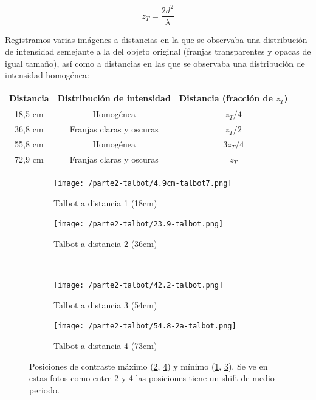 \documentclass{./packages/optica-article}
\begin{document}
\begin{center}
    \begin{equation}
        z_T = \frac{2d^2}{\lambda}
        \label{ec:zt}
    \end{equation}
\end{center}


Registramos varias imágenes a distancias en la que se observaba una distribución de intensidad semejante a la del objeto original (franjas transparentes y opacas de igual tamaño), así como a distancias en las que se observaba una distribución de intensidad homogénea:\par

\begin{center}
    \begin{tabular}{|c|c|c|} \hline
        Distancia & Distribución de intensidad & Distancia (fracción de $z_T$)\\ \hline
        18,5 cm & Homogénea & $z_T/4$\\ \hline
        36,8 cm & Franjas claras y oscuras & $z_T/2$\\ \hline
        55,8 cm & Homogénea & $3z_T/4$\\ \hline
        72,9 cm & Franjas claras y oscuras & $z_T$\\ \hline
    \end{tabular}
\end{center}

\begin{figure}[hptb]
\begin{center}
    \begin{subfigure}[t]{0.45\textwidth}\centering
        \texttt{[image: /parte2-talbot/4.9cm-talbot7.png]}
        \caption{ Talbot a distancia 1 (18cm)}
        \label{fig:talbot1}	
    \end{subfigure}
	\quad
	\begin{subfigure}[t]{0.45\textwidth}\centering
		\texttt{[image: /parte2-talbot/23.9-talbot.png]}
        \caption{Talbot a distancia 2 (36cm)}
        \label{fig:talbot2}
	\end{subfigure}
	\\
	\begin{subfigure}[t]{0.45\textwidth}\centering
		\texttt{[image: /parte2-talbot/42.2-talbot.png]}
        \caption{ Talbot a distancia 3 (54cm)}
        \label{fig:talbot3}
	\end{subfigure}
	\quad
	\begin{subfigure}[t]{0.45\textwidth}\centering
		\texttt{[image: /parte2-talbot/54.8-2a-talbot.png]}
        \caption{ Talbot a distancia 4 (73cm)}
        \label{fig:talbot4}
	\end{subfigure}
	
\caption{Posiciones de contraste máximo (\ref{fig:talbot2}, \ref{fig:talbot4}) y mínimo (\ref{fig:talbot1}, \ref{fig:talbot3}).
Se ve en estas fotos como entre \ref{fig:talbot2} y \ref{fig:talbot4} las posiciones tiene un shift de medio periodo.}
\label{fig:alltalbot}
\end{center}
\end{figure}
\end{document}
